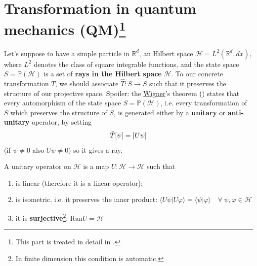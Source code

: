 \documentclass[../main.tex]{subfiles}
\begin{document}
\section[Transformation in QM]{Transformation in quantum mechanics (QM)\footnote{This part is treated in detail in .}}
Let's suppose to have a simple particle in $\mathbb{R}^d$, an Hilbert space $\mathcal{H}=L^2(\mathbb{R}^d,dx)$, where $L^2$ denotes the class of square integrable functions, and the state space $S=\mathbb{P}(\mathcal{H})$ is a set of \textbf{rays in the Hilbert space} $\mathcal{H}$. To our concrete transformation $T$, we should associate $\hat{T}:S \rightarrow S$ such that it preserves the structure of our projective space. Spoiler: the \href{https://en.wikipedia.org/wiki/Eugene_Wigner}{Wigner}'s theorem () states that every automorphism of the state space $S=\mathbb{P}(\mathcal{H})$, i.e. every transformation of $S$ which preserves the structure of $S$, is generated either by a \textbf{unitary} \underline{\underline{or}} \textbf{anti-unitary} operator, by setting
\[
\hat{T}\qty[\psi]=\qty[U\psi]
\]
(if $\psi\neq 0$ also $U\psi\neq 0$) so it gives a ray.
\begin{definition}
A unitary operator on $\mathcal{H}$ is a map $U:\mathcal{H}\rightarrow\mathcal{H}$ such that
    \begin{enumerate}
    \item is linear (therefore it is a linear operator);
    \item is isometric, i.e. it preserves the inner product: $\langle U\psi|U\varphi \rangle=\langle \psi|\varphi \rangle \quad \forall\ \psi,\varphi \in \mathcal{H}$
        \item {}it is \textbf{surjective}\footnote{In finite dimension this condition is automatic.}:  $\textrm{Ran}U=\mathcal{H}$
    \end{enumerate}
\end{definition}
\end{document}
